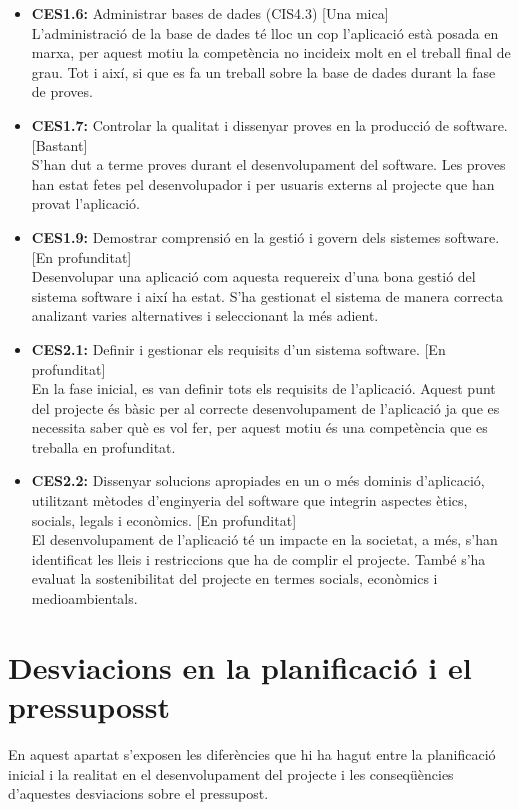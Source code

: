 \begin{itemize}
\item{}\textbf{CES1.6:} Administrar bases de dades (CIS4.3) [Una mica]\\
L’administració de la base de dades té lloc un cop l’aplicació està posada
en marxa, per aquest motiu la competència no incideix molt en el treball
final de grau. Tot i així, si que es fa un treball sobre la base de dades durant la fase de proves.
\item{}\textbf{CES1.7:} Controlar la qualitat i dissenyar proves en la producció de software. [Bastant]\\
S’han dut a terme proves durant el desenvolupament del software. Les
proves han estat fetes pel desenvolupador i per usuaris externs al projecte
que han provat l’aplicació.
\item{}\textbf{CES1.9:} Demostrar comprensió en la gestió i govern dels sistemes software. [En profunditat]\\
Desenvolupar una aplicació com aquesta requereix d’una bona gestió del
sistema software i així ha estat. S’ha gestionat el sistema de manera correcta analizant varies alternatives i seleccionant la més adient.
\item{}\textbf{CES2.1:} Definir i gestionar els requisits d’un sistema software. [En profunditat]\\
En la fase inicial, es van definir tots els requisits de l’aplicació. Aquest punt del projecte és bàsic per al correcte desenvolupament de l’aplicació ja que es necessita saber què es vol fer, per aquest motiu és una competència que es treballa en profunditat.
\item{}\textbf{CES2.2:} Dissenyar solucions apropiades en un o més dominis d’aplicació, utilitzant mètodes d’enginyeria del software que integrin aspectes ètics, socials, legals i econòmics. [En profunditat]\\
El desenvolupament de l’aplicació té un impacte en la societat, a més, s’han identificat les lleis i restriccions que ha de complir el projecte. També s’ha evaluat la sostenibilitat del projecte en termes socials, econòmics i medioambientals.
\end{itemize}

\section{Desviacions en la planificació i el pressuposst}

En aquest apartat s’exposen les diferències que hi ha hagut entre la planificació inicial i la realitat en el desenvolupament del projecte i les conseqüències
d’aquestes desviacions sobre el pressupost.\\

